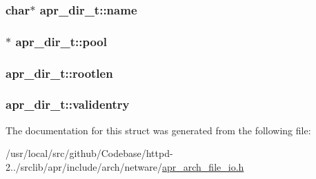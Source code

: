 \subsubsection[{\texorpdfstring{name}{name}}]{\setlength{\rightskip}{0pt plus 5cm}char$\ast$ apr\+\_\+dir\+\_\+t\+::name}\hypertarget{structapr__dir__t_a32bbf12a97448197d0a3b3b20455493b}{}\label{structapr__dir__t_a32bbf12a97448197d0a3b3b20455493b}
\subsubsection[{\texorpdfstring{pool}{pool}}]{ $\ast$ apr\+\_\+dir\+\_\+t\+::pool}\hypertarget{structapr__dir__t_a3cb1521d8e75d392e708934f9c6fd178}{}\label{structapr__dir__t_a3cb1521d8e75d392e708934f9c6fd178}
\subsubsection[{\texorpdfstring{rootlen}{rootlen}}]{ apr\+\_\+dir\+\_\+t\+::rootlen}\hypertarget{structapr__dir__t_a97d647b007059676624eb23b3805fc6a}{}\label{structapr__dir__t_a97d647b007059676624eb23b3805fc6a}
\subsubsection[{\texorpdfstring{validentry}{validentry}}]{ apr\+\_\+dir\+\_\+t\+::validentry}\hypertarget{structapr__dir__t_a66d28636c6bf3b54be03ad229230f4a7}{}\label{structapr__dir__t_a66d28636c6bf3b54be03ad229230f4a7}


The documentation for this struct was generated from the following file\+:\begin{DoxyCompactItemize}
\item 
/usr/local/src/github/\+Codebase/httpd-\/2../srclib/apr/include/arch/netware/\hyperlink{netware_2apr__arch__file__io_8h}{apr\+\_\+arch\+\_\+file\+\_\+io.\+h}\end{DoxyCompactItemize}
